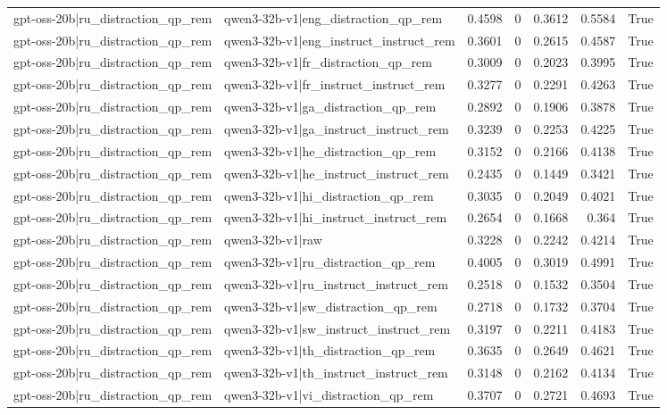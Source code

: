 \begin{table}
\begin{tabular}{l l r r r r l}
gpt-oss-20b|ru_distraction_qp_rem & qwen3-32b-v1|eng_distraction_qp_rem & 0.4598 & 0 & 0.3612 & 0.5584 & True \\
gpt-oss-20b|ru_distraction_qp_rem & qwen3-32b-v1|eng_instruct_instruct_rem & 0.3601 & 0 & 0.2615 & 0.4587 & True \\
gpt-oss-20b|ru_distraction_qp_rem & qwen3-32b-v1|fr_distraction_qp_rem & 0.3009 & 0 & 0.2023 & 0.3995 & True \\
gpt-oss-20b|ru_distraction_qp_rem & qwen3-32b-v1|fr_instruct_instruct_rem & 0.3277 & 0 & 0.2291 & 0.4263 & True \\
gpt-oss-20b|ru_distraction_qp_rem & qwen3-32b-v1|ga_distraction_qp_rem & 0.2892 & 0 & 0.1906 & 0.3878 & True \\
gpt-oss-20b|ru_distraction_qp_rem & qwen3-32b-v1|ga_instruct_instruct_rem & 0.3239 & 0 & 0.2253 & 0.4225 & True \\
gpt-oss-20b|ru_distraction_qp_rem & qwen3-32b-v1|he_distraction_qp_rem & 0.3152 & 0 & 0.2166 & 0.4138 & True \\
gpt-oss-20b|ru_distraction_qp_rem & qwen3-32b-v1|he_instruct_instruct_rem & 0.2435 & 0 & 0.1449 & 0.3421 & True \\
gpt-oss-20b|ru_distraction_qp_rem & qwen3-32b-v1|hi_distraction_qp_rem & 0.3035 & 0 & 0.2049 & 0.4021 & True \\
gpt-oss-20b|ru_distraction_qp_rem & qwen3-32b-v1|hi_instruct_instruct_rem & 0.2654 & 0 & 0.1668 & 0.364 & True \\
gpt-oss-20b|ru_distraction_qp_rem & qwen3-32b-v1|raw & 0.3228 & 0 & 0.2242 & 0.4214 & True \\
gpt-oss-20b|ru_distraction_qp_rem & qwen3-32b-v1|ru_distraction_qp_rem & 0.4005 & 0 & 0.3019 & 0.4991 & True \\
gpt-oss-20b|ru_distraction_qp_rem & qwen3-32b-v1|ru_instruct_instruct_rem & 0.2518 & 0 & 0.1532 & 0.3504 & True \\
gpt-oss-20b|ru_distraction_qp_rem & qwen3-32b-v1|sw_distraction_qp_rem & 0.2718 & 0 & 0.1732 & 0.3704 & True \\
gpt-oss-20b|ru_distraction_qp_rem & qwen3-32b-v1|sw_instruct_instruct_rem & 0.3197 & 0 & 0.2211 & 0.4183 & True \\
gpt-oss-20b|ru_distraction_qp_rem & qwen3-32b-v1|th_distraction_qp_rem & 0.3635 & 0 & 0.2649 & 0.4621 & True \\
gpt-oss-20b|ru_distraction_qp_rem & qwen3-32b-v1|th_instruct_instruct_rem & 0.3148 & 0 & 0.2162 & 0.4134 & True \\
gpt-oss-20b|ru_distraction_qp_rem & qwen3-32b-v1|vi_distraction_qp_rem & 0.3707 & 0 & 0.2721 & 0.4693 & True \\

\end{tabular}
\end{table}
